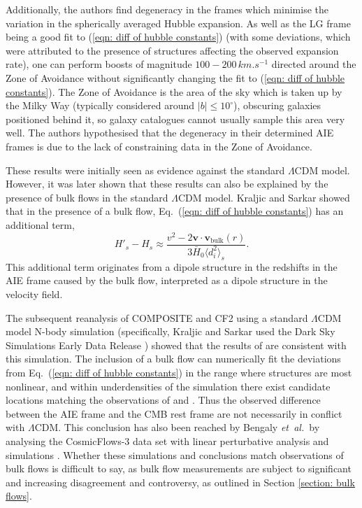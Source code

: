 \documentclass[a4paper,12pt]{report}
\renewcommand{\vec}[1]{\ensuremath{\bm{#1}}}
\newcommand{\degree}{^\circ}
\newcommand{\etal}{\emph{et~al.\ }}
\renewcommand{\eqref}[1]{Eq.~({#1})}
\begin{document}
Additionally, the authors find degeneracy in the frames which minimise the variation in the spherically averaged Hubble expansion. As well as the LG frame being a good fit to (\ref{eqn: diff of hubble constants}) (with some deviations, which were attributed to the presence of structures affecting the observed expansion rate), one can perform boosts of magnitude $100 - 200\, \si{km.s^{-1}}$ directed around the Zone of Avoidance without significantly changing the fit to (\ref{eqn: diff of hubble constants}). The Zone of Avoidance is the area of the sky which is taken up by the Milky Way (typically considered around $|b| \leq 10\degree$), obscuring galaxies positioned behind it, so galaxy catalogues cannot usually sample this area very well. The authors hypothesised that the degeneracy in their determined AIE frames is due to the lack of constraining data in the Zone of Avoidance.

These results were initially seen as evidence against the standard $\Lambda$CDM model. However, it was later shown that these results can also be explained by the presence of bulk flows in the standard $\Lambda$CDM model. Kraljic and Sarkar \cite{RN122} showed that in the presence of a bulk flow, \eqref{\ref{eqn: diff of hubble constants}} has an additional term,
\begin{equation} \label{eqn: diff of hubble constants with bulk flow}
  H'_s - H_s \approx \frac{v^2 - 2 \vec{v} \cdot \vec{v}_\text{bulk}(r)}{3\bar{H}_0 \langle d_i^2 \rangle_s}.
\end{equation}
This additional term originates from a dipole structure in the redshifts in the AIE frame caused by the bulk flow, interpreted as a dipole structure in the velocity field.

The subsequent reanalysis of COMPOSITE and CF2 using a standard $\Lambda$CDM model N-body simulation (specifically, Kraljic and Sarkar used the Dark Sky Simulations Early Data Release \cite{RN178}) showed that the results of \cite{RN35,RN40} are consistent with this simulation. The inclusion of a bulk flow can numerically fit the deviations from \eqref{\ref{eqn: diff of hubble constants}} in the range where structures are most nonlinear, and within underdensities of the simulation there exist candidate locations matching the observations of \cite{RN35} and \cite{RN40}. Thus the observed difference between the AIE frame and the CMB rest frame are not necessarily in conflict with $\Lambda$CDM.
This conclusion has also been reached by Bengaly \etal by analysing the CosmicFlows-3 data set with linear perturbative analysis and simulations \cite{RN123}.
Whether these simulations and conclusions match observations of bulk flows is difficult to say, as bulk flow measurements are subject to significant and increasing disagreement and controversy, as outlined in Section \ref{section: bulk flows}.
\end{document}
